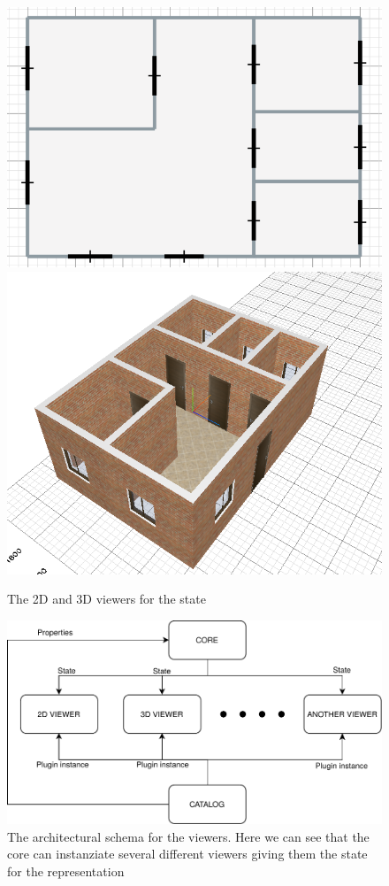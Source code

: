 \begin{figure}[htb]
\centering
\includegraphics[width=0.45\linewidth]{contents/images/2d-viewer}
\includegraphics[width=0.45\linewidth]{contents/images/3d-viewer}
\caption{The 2D and 3D viewers for the state}
\label{fig_viewer}
\end{figure}


\begin{figure}[htb]
\centering
\includegraphics[width=\linewidth]{contents/images/diagramma-visualizzatori}

\caption{The architectural schema for the viewers. Here we can see that the core can instanziate several different viewers giving them the state for the representation}
\label{fig_viewers}
\end{figure}

